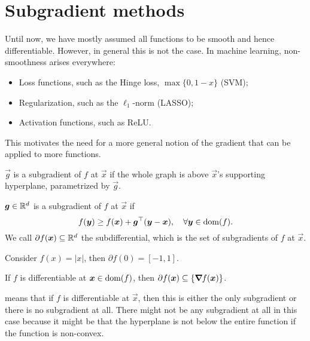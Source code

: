 \section{Subgradient methods}

Until now, we have mostly assumed all functions to be smooth and hence differentiable. However, in
general this is not the case. In machine learning, non-smoothness arises everywhere:
\begin{itemize}
    \item Loss functions, such as the Hinge loss, $\max\{ 0, 1-x \}$ (SVM);
    \item Regularization, such as the $\ell_1$-norm (LASSO);
    \item Activation functions, such as ReLU.
\end{itemize}

This motivates the need for a more general notion of the gradient that can be applied to more
functions.

\begin{marginfigure}[3.5cm]
    \centering
    \caption{$\vec{g}$ is a subgradient of $f$ at $\vec{x}$ if the whole graph is above $\vec{x}$'s supporting hyperplane, parametrized by $\vec{g}$.}
    \label{fig:subgradient}
\end{marginfigure}

\begin{definition}[Subgradient]
    $\bm{g} \in \mathbb{R}^d$ is a subgradient of $f$ at $\vec{x}$ if \[
        f(\bm{y}) \geq f(\bm{x}) + \bm{g}^\top(\bm{y} - \bm{x}), \quad \forall \bm{y} \in \mathrm{dom}(f).
    \]
    We call $\partial f(\bm{x}) \subseteq \mathbb{R}^d$ the subdifferential, which is the set of subgradients
    of $f$ at $\vec{x}$.
\end{definition}

\begin{example}
    Consider $f(x) = |x|$, then $\partial f(0) = [-1, 1]$.
\end{example}

\begin{lemma}
    \label{lem:diff-subdiff}

    If $f$ is differentiable at $\bm{x} \in \mathrm{dom}(f)$, then $\partial f(\bm{x}) \subseteq \{
        \bm{\nabla}_{\! } f(\bm{x}) \}$.
\end{lemma}

 means that if $f$ is differentiable at $\vec{x}$, then this is either the
only subgradient or there is no subgradient at all. There might not be any subgradient at all in this
case because it might be that the hyperplane is not below the entire function if the function is
non-convex.

